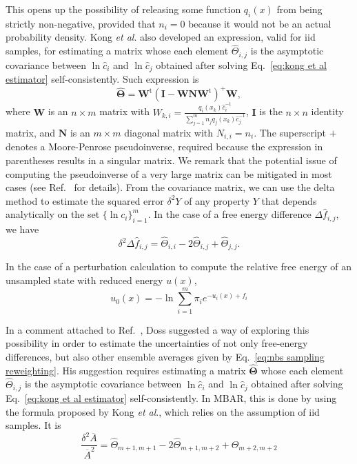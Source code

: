 \documentclass[aip,jcp,reprint,amsmath,amssymb]{revtex4-1}
\newcommand{\mt}[1]{\boldsymbol{\mathbf{#1}}}           %
\newcommand{\tr}[1]{#1^\text{t}}                        %
\begin{document}
This opens up the possibility of releasing some function $q_i(x)$ from being strictly non-negative, provided that $n_i = 0$ because it would not be an actual probability density. Kong \textit{et al}.\cite{Kong_2003} also developed an expression, valid for iid samples, for estimating a matrix whose each element $\hat \Theta_{i,j}$ is the asymptotic covariance between $\ln \hat c_i$ and $\ln \hat c_j$ obtained after solving Eq.~\eqref{eq:kong et al estimator} self-consistently. Such expression is
\begin{equation}
\label{eq:mbar covariance matrix}
\hat{\mt \Theta} = \tr{\mt W}(\mt I - {\mt W}{\mt N}\tr{\mt W})^+{\mt W},
\end{equation}
where $\mt W$ is an $n \times m$ matrix with $W_{k,i} = \frac{q_i(x_k) \hat c_i^{-1}}{\sum_{j=1}^m n_j q_j(x_k) \hat c_j^{-1}}$, $\mt I$ is the $n \times n$ identity matrix, and $\mt N$ is an $m \times m$ diagonal matrix with $N_{i,i} = n_i$. The superscript $+$ denotes a Moore-Penrose pseudoinverse, required because the expression in parentheses results in a singular matrix. We remark that the potential issue of computing the pseudoinverse of a very large matrix can be mitigated in most cases (see Ref.~ for details). From the covariance matrix, we can use the delta method\cite{Greene_2012} to estimate the squared error $\delta^2 Y$ of any property $Y$ that depends analytically on the set $\{\ln c_i\}_{i=1}^m$. In the case of a free energy difference $\Delta \hat f_{i,j}$, we have
\begin{equation}
\label{eq:mbar free mean-square error}
\delta^2 \Delta {\hat f_{i,j}} = {\hat \Theta}_{i,i} - 2 {\hat \Theta}_{i,j} + {\hat \Theta}_{j,j}.
\end{equation}

In the case of a perturbation calculation to compute the relative free energy of an unsampled state with reduced energy $u(x)$,
\begin{equation}
\label{eq:mixture potential}
u_0(x) = -\ln \sum_{i=1}^m \pi_i e^{-u_i(x) + f_i}
\end{equation}

In a comment attached to Ref.~, Doss suggested a way of exploring this possibility in order to estimate the uncertainties of not only free-energy differences, but also other ensemble averages given by Eq.~\eqref{eq:nbs sampling reweighting}. His suggestion requires estimating a matrix $\hat {\mt \Theta}$ whose each element $\hat \Theta_{i,j}$ is the asymptotic covariance between $\ln \hat c_i$ and $\ln \hat c_j$ obtained after solving Eq.~\eqref{eq:kong et al estimator} self-consistently. In MBAR, this is done by using the formula proposed by Kong \textit{et al}.,\cite{Kong_2003} which relies on the assumption of iid samples. It is
\begin{equation*}
\frac{\delta^2 \overline A}{\overline A^2} = {\hat \Theta}_{m+1,m+1} - 2 {\hat \Theta}_{m+1,m+2} + {\hat \Theta}_{m+2,m+2}
\end{equation*}
\end{document}
